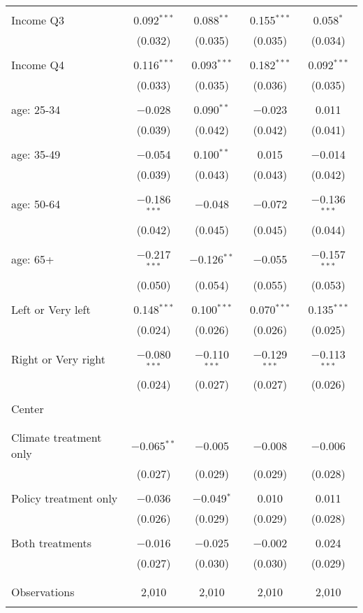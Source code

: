 \begin{tabular}{@{\extracolsep{5pt}}lcccc}
  & & & & \\ 
 Income Q3 & 0.092$^{***}$ & 0.088$^{**}$ & 0.155$^{***}$ & 0.058$^{*}$ \\ 
  & (0.032) & (0.035) & (0.035) & (0.034) \\ 
  & & & & \\ 
 Income Q4 & 0.116$^{***}$ & 0.093$^{***}$ & 0.182$^{***}$ & 0.092$^{***}$ \\ 
  & (0.033) & (0.035) & (0.036) & (0.035) \\ 
  & & & & \\ 
 age: 25-34 & $-$0.028 & 0.090$^{**}$ & $-$0.023 & 0.011 \\ 
  & (0.039) & (0.042) & (0.042) & (0.041) \\ 
  & & & & \\ 
 age: 35-49 & $-$0.054 & 0.100$^{**}$ & 0.015 & $-$0.014 \\ 
  & (0.039) & (0.043) & (0.043) & (0.042) \\ 
  & & & & \\ 
 age: 50-64 & $-$0.186$^{***}$ & $-$0.048 & $-$0.072 & $-$0.136$^{***}$ \\ 
  & (0.042) & (0.045) & (0.045) & (0.044) \\ 
  & & & & \\ 
 age: 65+ & $-$0.217$^{***}$ & $-$0.126$^{**}$ & $-$0.055 & $-$0.157$^{***}$ \\ 
  & (0.050) & (0.054) & (0.055) & (0.053) \\ 
  & & & & \\ 
 Left or Very left & 0.148$^{***}$ & 0.100$^{***}$ & 0.070$^{***}$ & 0.135$^{***}$ \\ 
  & (0.024) & (0.026) & (0.026) & (0.025) \\ 
  & & & & \\ 
 Right or Very right & $-$0.080$^{***}$ & $-$0.110$^{***}$ & $-$0.129$^{***}$ & $-$0.113$^{***}$ \\ 
  & (0.024) & (0.027) & (0.027) & (0.026) \\ 
  & & & & \\ 
 Center &  &  &  &  \\ 
  &  &  &  &  \\ 
  & & & & \\ 
 Climate treatment only & $-$0.065$^{**}$ & $-$0.005 & $-$0.008 & $-$0.006 \\ 
  & (0.027) & (0.029) & (0.029) & (0.028) \\ 
  & & & & \\ 
 Policy treatment only & $-$0.036 & $-$0.049$^{*}$ & 0.010 & 0.011 \\ 
  & (0.026) & (0.029) & (0.029) & (0.028) \\ 
  & & & & \\ 
 Both treatments & $-$0.016 & $-$0.025 & $-$0.002 & 0.024 \\ 
  & (0.027) & (0.030) & (0.030) & (0.029) \\ 
  & & & & \\ 
\hline \\[-1.8ex] 

Observations & 2,010 & 2,010 & 2,010 & 2,010 \\ 
\hline 
\hline \\[-1.8ex] 
\end{tabular} 